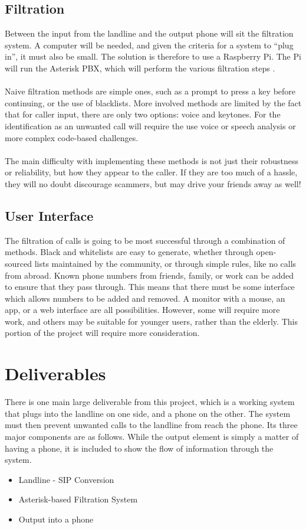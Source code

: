 \documentclass[12pt,a4paper]{report}
\begin{document}
\subsection{Filtration}
Between the input from the landline and the output phone will sit the filtration system. A computer will be needed, and given the criteria for a system to ``plug in'', it must also be small. The solution is therefore to use a Raspberry Pi. The Pi will run the Asterisk PBX, which will perform the various filtration steps \cite{raspbx}.
\\\\
Naive filtration methods are simple ones, such as a prompt to press a key before continuing, or the use of blacklists. More involved methods are limited by the fact that for caller input, there are only two options: voice and keytones. For the identification as an unwanted call will require the use voice or speech analysis or more complex code-based challenges.
\\\\
The main difficulty with implementing these methods is not just their robustness or reliability, but how they appear to the caller. If they are too much of a hassle, they will no doubt discourage scammers, but may drive your friends away as well!

\subsection{User Interface}
The filtration of calls is going to be most successful through a combination of methods. Black and whitelists are easy to generate, whether through open-sourced lists maintained by the community, or through simple rules, like no calls from abroad. Known phone numbers from friends, family, or work can be added to ensure that they pass through. This means that there must be some interface which allows numbers to be added and removed. A monitor with a mouse, an app, or a web interface are all possibilities. However, some will require more work, and others may be suitable for younger users, rather than the elderly. This portion of the project will require more consideration.

\section{Deliverables}
There is one main large deliverable from this project, which is a working system that plugs into the landline on one side, and a phone on the other. The system must then prevent unwanted calls to the landline from reach the phone. Its three major components are as follows. While the output element is simply a matter of having a phone, it is included to show the flow of information through the system.
\begin{itemize}
  \item Landline - SIP Conversion
  \item Asterisk-based Filtration System
  \item Output into a phone
\end{itemize}
\end{document}
